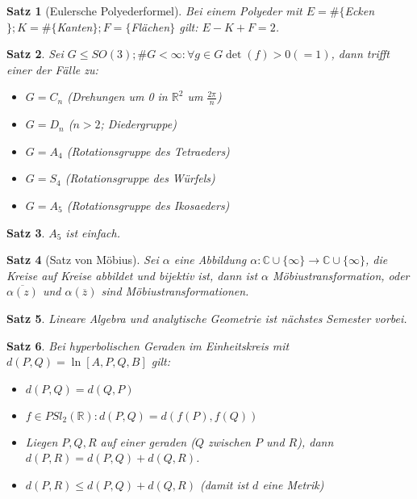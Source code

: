\documentclass[ngerman,halfparskip]{scrartcl}
\newtheorem{satz}{Satz}
\def\R{\mathbb R}
\def\C{\mathbb C}
\begin{document}
\begin{satz}[Eulersche Polyederformel]
Bei einem Polyeder mit $E=\#\{$Ecken$\}; K=\#\{$Kanten$\}; F=\{$Flächen$\}$ gilt: $E-K+F=2$. 
\end{satz}




\begin{satz}
Sei $G\leq SO(3); \#G<\infty: \forall g\in G \det(f)>0 (=1)$, dann trifft einer der Fälle zu:
\begin{itemize}
\item $G=C_n$ (Drehungen um 0 in $\R^2$ um $\frac {2\pi}n$)
\item $G=D_n$ ($n>2$; Diedergruppe)
\item $G=A_4$ (Rotationsgruppe des Tetraeders)
\item $G=S_4$ (Rotationsgruppe des Würfels)
\item $G=A_5$ (Rotationsgruppe des Ikosaeders)
\end{itemize}
\end{satz}


\begin{satz}
$A_5$ ist einfach. 
\end{satz}




\begin{satz}[Satz von Möbius]
Sei $\alpha$ eine Abbildung $\alpha: \C \cup \{\infty\} \rightarrow \C \cup \{\infty\}$, die Kreise auf Kreise abbildet und bijektiv ist, dann ist $\alpha$ Möbiustransformation, oder $\overline{\alpha(z)}$ und $\alpha(\overline z)$ sind Möbiustransformationen.
\end{satz}



\begin{satz}
Lineare Algebra und analytische Geometrie ist nächstes Semester vorbei.
\end{satz}


\begin{satz}
Bei hyperbolischen Geraden im Einheitskreis mit $d(P,Q)=\ln [A,P,Q,B]$ gilt:
\begin{itemize}
\item $d(P,Q)=d(Q,P)$
\item $f\in PSl_2(\R): d(P,Q)=d(f(P),f(Q))$
\item Liegen $P,Q,R$ auf einer geraden ($Q$ zwischen $P$ und $R$), dann $d(P,R)=d(P,Q)+d(Q,R)$.
\item $d(P,R)\leq d(P,Q)+d(Q,R)$ (damit ist $d$ eine Metrik)
\end{itemize}
\end{satz}
\end{document}

